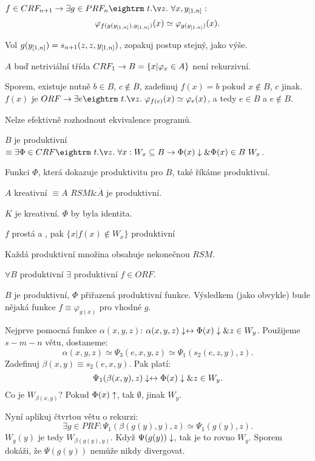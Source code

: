 \begin{multicols}{3}
 $f \in CRF_{n+1} \then \exists g \in PRF_n \st \forall x,\mls y n :$
$$ \varphi_{f(g(y_{[1,n]} ), y_{[1,n]} )}(x) \simeq \varphi_{g(y_{[1,n]} )}(x).$$

\prf{} Vol $g(y_{[1,n]} ) = s_{n+1}(z,z,y_{[1,n]} )$, zopakuj postup stejný, jako výše.

 $A$ buď netriviální třída $CRF_1 \rightarrow B = \{x | \varphi_x \in A\}$ není rekurzivní.

\prf{} Sporem, existuje nutně $b \in B$, $c \not \in B$, zadefinuj $f(x) = b$ pokud $x \not \in B$, $c$ jinak.
$f(x)$ je $ORF \then \exists e \st \varphi_{f(e)}(x) \simeq \varphi_e(x)$, a tedy $e \in B$ a $e \not \in B$.

\res{} Nelze efektivně rozhodnout ekvivalence programů.


\dfn{} $B$ je produktivní $\equiv \exists \Phi \in CRF \st \forall x: W_x \subseteq B \then \Phi(x) \da \& \Phi(x) \in B \ W_x$.

\dfn{} Funkci $\Phi$, která dokazuje produktivitu pro $B$, také říkáme produktivní.

\dfn{} $A$ kreativní $\equiv A$ $RSM \& \overline{A}$ je produktivní.

\obs{} $K$ je kreativní. $\Phi$ by byla identita.

\obs{} $f$ prostá a \ORF, pak $\{x | f(x) \not \in W_x\}$ produktivní

\obs{} Každá produktivní množina obsahuje nekonečnou $RSM$. 

 $\forall B$ produktivní $\exists$ produktivní $f \in ORF$.

\prf{}
$B$ je produktivní, $\Phi$ přiřazená produktivní funkce. Výsledkem (jako obvykle) bude
nějaká funkce $f \equiv \varphi_{g(x)}$ pro vhodné $g$.

Nejprve pomocná funkce $\alpha(x,y,z)$: $\alpha(x,y,z)\downarrow \leftrightarrow \Phi(x)\downarrow \& z \in W_y$.
Použijeme $s-m-n$ větu, dostaneme:
$$ \alpha(x,y,z) \simeq \Psi_3(e,x,y,z) \simeq \Psi_1(s_2(e,z,y),z).$$
Zadefinuj \PRF $\beta(x,y) \equiv s_2(e,x,y)$. Pak platí:
$$ \Psi_1(\beta(x,y),z) \downarrow \leftrightarrow \Phi(x)\downarrow \& z \in W_y. $$
Co je $W_{\beta(x,y)}$? Pokud $\Phi(x) \uparrow$, tak $\emptyset$, jinak $W_y$.

Nyní aplikuj čtvrtou větu o rekurzi:
$$ \exists g \in PRF: \Psi_1(β(g(y),y),z) \simeq \Psi_1(g(y),z). $$
$W_g(y)$ je tedy $W_{\beta(g(y),y)}$. Když $\Psi(g(y)) \downarrow$, tak je to rovno $W_y$. 
Sporem dokáži, že $\Psi(g(y))$ nemůže nikdy divergovat.
 

\end{multicols}
